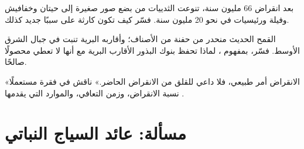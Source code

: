 \begin{exercise}[$\star\star\star$]\label{exo:g10:biodiversity-scales:13}
بعد انقراض 66 مليون سنة، تنوعت الثدييات من بضع صور صغيرة إلى حيتان
وخفافيش وفيلة ورئيسيات في نحو 20 مليون سنة. فسّر كيف تكون كارثة على
 سببًا  جديد كذلك.
\end{exercise}

\begin{exercise}[$\star\star\star$]\label{exo:g10:biodiversity-scales:14}
القمح الحديث منحدر من حفنة من الأصناف؛ وأقاربه البرية تنبت في جبال
الشرق الأوسط. فسّر، بمفهوم ، لماذا تحفظ بنوك البذور
الأقارب البرية مع أنها لا تعطي محصولًا صالحًا.
\end{exercise}

\begin{exercise}[$\star\star\star$]\label{exo:g10:biodiversity-scales:15}
«الانقراض أمر طبيعي، فلا داعي للقلق من الانقراض الحاضر.» ناقش في فقرة
مستعملًا نسبة الانقراض، وزمن التعافي، والموارد التي يقدمها .
\end{exercise}

\section{مسألة: عائد السياج النباتي}

